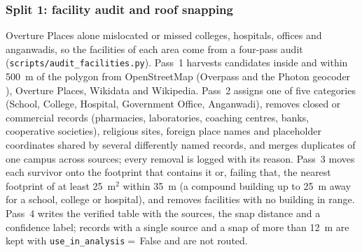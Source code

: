 \documentclass[10pt,a4paper,twocolumn]{article}
\begin{document}
\subsubsection{Split 1: facility audit and roof snapping}\label{sec:audit}
Overture Places alone mislocated or missed colleges, hospitals, offices and anganwadis, so the facilities of each area come from a four-pass audit (\texttt{scripts/audit\_facilities.py}). Pass~1 harvests candidates inside and within 500~m of the polygon from OpenStreetMap \cite{haklay2008osm} (Overpass and the Photon geocoder \cite{photon2026}), Overture Places, Wikidata and Wikipedia. Pass~2 assigns one of five categories (School, College, Hospital, Government Office, Anganwadi), removes closed or commercial records (pharmacies, laboratories, coaching centres, banks, cooperative societies), religious sites, foreign place names and placeholder coordinates shared by several differently named records, and merges duplicates of one campus across sources; every removal is logged with its reason. Pass~3 moves each survivor onto the footprint that contains it or, failing that, the nearest footprint of at least 25~m$^2$ within 35~m (a compound building up to 25~m away for a school, college or hospital), and removes facilities with no building in range. Pass~4 writes the verified table with the sources, the snap distance and a confidence label; records with a single source and a snap of more than 12~m are kept with \texttt{use\_in\_analysis}${}=$\,False and are not routed.
\end{document}
